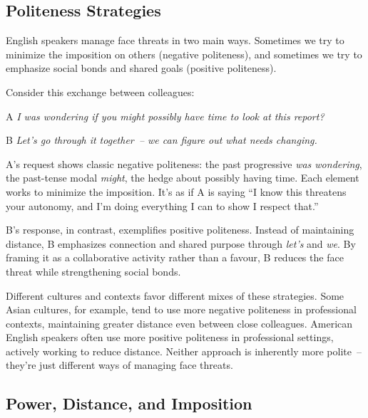 \subsection{Politeness Strategies}

English speakers manage face threats in two main ways. Sometimes we try to minimize the imposition on others (negative politeness), and sometimes we try to emphasize social bonds and shared goals (positive politeness).

Consider this exchange between colleagues:

\begin{dialogue}
\item[A] \textit{I was wondering if you might possibly have time to look at this report?}
\item[B] \textit{Let's go through it together~-- we can figure out what needs changing.}
\end{dialogue}

A's request shows classic negative politeness: the past progressive \textit{was wondering}, the past-tense modal \textit{might}, the hedge about possibly having time. Each element works to minimize the imposition. It's as if A is saying ``I know this threatens your autonomy, and I'm doing everything I can to show I respect that.''

B's response, in contrast, exemplifies positive politeness. Instead of maintaining distance, B emphasizes connection and shared purpose through \textit{let's} and \textit{we}. By framing it as a collaborative activity rather than a favour, B reduces the face threat while strengthening social bonds.

Different cultures and contexts favor different mixes of these strategies. Some Asian cultures, for example, tend to use more negative politeness in professional contexts, maintaining greater distance even between close colleagues. American English speakers often use more positive politeness in professional settings, actively working to reduce distance. Neither approach is inherently more polite~-- they're just different ways of managing face threats.

\subsection{Power, Distance, and Imposition}\label{sec:power}

